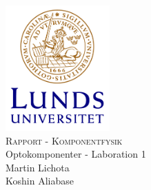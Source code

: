 \begin{titlepage}
\begin{center}
\includegraphics[width=0.30\textwidth]{./logo}~\\[1cm]
\textsc{\LARGE Rapport - Komponentfysik}\\
\textup{Optokomponenter - Laboration 1}\\[1cm]
Martin Lichota\\
Koshin Aliabase\\

\end{center}
\end{titlepage}
